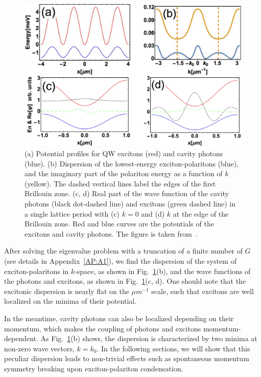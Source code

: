 %
%
%
\begin{figure}[ht]
\centering
	\includegraphics[width=0.79\linewidth]{Fig/Ch2/fig1.pdf}
	\caption[Potential setting, eigenenergy, and eigenstate of the system]{(a) Potential profiles for QW excitons (red) and cavity photons (blue). (b) Dispersion of the lowest-energy exciton-polaritons (blue), and the imaginary part of the polariton energy as a function of $k$ (yellow). The dashed vertical lines label the edges of the first Brillouin zone. (c, d) Real part of the wave function of the cavity photons (black dot-dashed line) and excitons (green dashed line) in a single lattice period with (c) $k=0$ and (d) $k$ at the edge of the Brillouin zone. Red and blue curves are the potentials of the excitons and cavity photons. The figure is taken from~\cite{Sun:2017ab}.}
	\label{fig:CH2_Fig1}
\end{figure}
%
%
%

After solving the eigenvalue problem with a truncation of a finite number of $G$ (see details in Appendix~\ref{AP:A1}), we find the dispersion of the system of exciton-polaritons in $k$-space, as shown in Fig.~\ref{fig:CH2_Fig1}(b), and the wave functions of the photons and excitons, as shown in Fig.~\ref{fig:CH2_Fig1}(c, d).
One should note that the excitonic dispersion is nearly flat on the $\mu m^{-1}$ scale, such that excitons are well localized on the minima of their potential.

In the meantime, cavity photons can also be localized depending on their momentum, which makes the coupling of photons and excitons momentum-dependent.
As Fig.~\ref{fig:CH2_Fig1}(b) shows, the dispersion is characterized by two minima at non-zero wave vectors, $k=k_0$.
In the following sections, we will show that this peculiar dispersion leads to non-trivial effects such as spontaneous momentum symmetry breaking upon exciton-polariton condensation.

